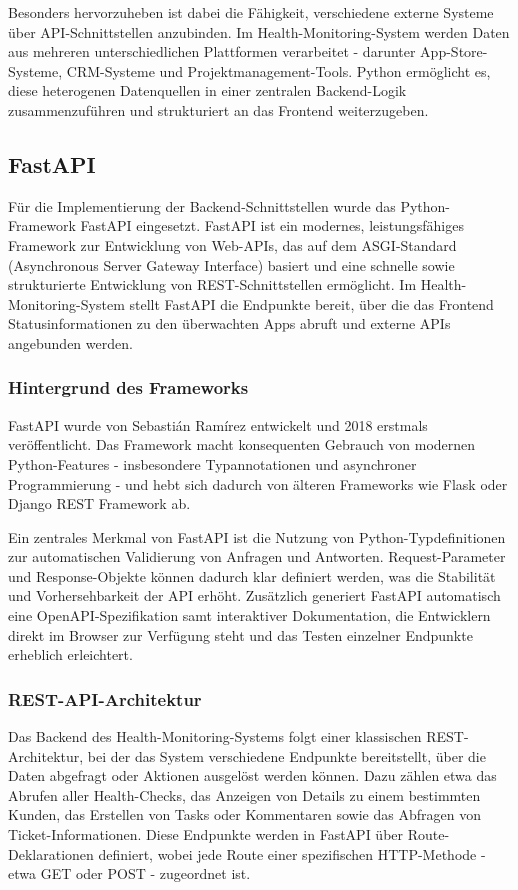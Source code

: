 Besonders hervorzuheben ist dabei die Fähigkeit, verschiedene externe Systeme über API-Schnittstellen anzubinden. Im Health-Monitoring-System werden Daten aus mehreren unterschiedlichen Plattformen verarbeitet - darunter App-Store-Systeme, CRM-Systeme und Projektmanagement-Tools. Python ermöglicht es, diese heterogenen Datenquellen in einer zentralen Backend-Logik zusammenzuführen und strukturiert an das Frontend weiterzugeben.

\subsection{FastAPI}
Für die Implementierung der Backend-Schnittstellen wurde das Python-Framework FastAPI eingesetzt. FastAPI ist ein modernes, leistungsfähiges Framework zur Entwicklung von Web-APIs, das auf dem ASGI-Standard (Asynchronous Server Gateway Interface) basiert und eine schnelle sowie strukturierte Entwicklung von REST-Schnittstellen ermöglicht. Im Health-Monitoring-System stellt FastAPI die Endpunkte bereit, über die das Frontend Statusinformationen zu den überwachten Apps abruft und externe APIs angebunden werden.

\subsubsection{Hintergrund des Frameworks}
FastAPI wurde von Sebastián Ramírez entwickelt und 2018 erstmals veröffentlicht. Das Framework macht konsequenten Gebrauch von modernen Python-Features - insbesondere Typannotationen und asynchroner Programmierung - und hebt sich dadurch von älteren Frameworks wie Flask oder Django REST Framework ab.

Ein zentrales Merkmal von FastAPI ist die Nutzung von Python-Typdefinitionen zur automatischen Validierung von Anfragen und Antworten. Request-Parameter und Response-Objekte können dadurch klar definiert werden, was die Stabilität und Vorhersehbarkeit der API erhöht. Zusätzlich generiert FastAPI automatisch eine OpenAPI-Spezifikation samt interaktiver Dokumentation, die Entwicklern direkt im Browser zur Verfügung steht und das Testen einzelner Endpunkte erheblich erleichtert. \cite{fastapi_docs}

\subsubsection{REST-API-Architektur}
Das Backend des Health-Monitoring-Systems folgt einer klassischen REST-Architektur, bei der das System verschiedene Endpunkte bereitstellt, über die Daten abgefragt oder Aktionen ausgelöst werden können. Dazu zählen etwa das Abrufen aller Health-Checks, das Anzeigen von Details zu einem bestimmten Kunden, das Erstellen von Tasks oder Kommentaren sowie das Abfragen von Ticket-Informationen. Diese Endpunkte werden in FastAPI über Route-Deklarationen definiert, wobei jede Route einer spezifischen HTTP-Methode - etwa GET oder POST - zugeordnet ist.

